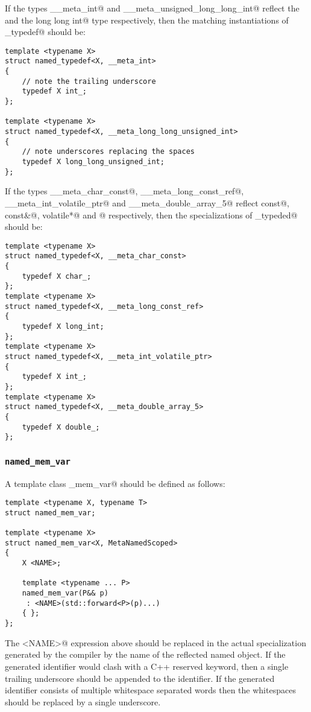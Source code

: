 If the types \verb@__meta_int@ and \verb@__meta_unsigned_long_long_int@ reflect the \verb@int@ and
the \verb@unsigned long long int@ type
respectively, then the matching instantiations of \verb@named_typedef@ should be:

\begin{verbatim}
template <typename X>
struct named_typedef<X, __meta_int>
{
	// note the trailing underscore
	typedef X int_;
};

template <typename X>
struct named_typedef<X, __meta_long_long_unsigned_int>
{
	// note underscores replacing the spaces
	typedef X long_long_unsigned_int;
};
\end{verbatim}

If the types \verb@__meta_char_const@, \verb@__meta_long_const_ref@, \verb@__meta_int_volatile_ptr@ and \verb@__meta_double_array_5@
reflect \verb@char const@, \verb@long const&@, \verb@int volatile*@ and \verb@double[5]@ respectively,
then the specializations of \verb@named_typeded@ should be:

\begin{verbatim}
template <typename X>
struct named_typedef<X, __meta_char_const>
{
	typedef X char_;
};
template <typename X>
struct named_typedef<X, __meta_long_const_ref>
{
	typedef X long_int;
};
template <typename X>
struct named_typedef<X, __meta_int_volatile_ptr>
{
	typedef X int_;
};
template <typename X>
struct named_typedef<X, __meta_double_array_5>
{
	typedef X double_;
};
\end{verbatim}

\subsubsection{\texttt{named\_mem\_var}}

A template class \verb@named_mem_var@ should be defined as follows:

\begin{verbatim}
template <typename X, typename T>
struct named_mem_var;

template <typename X>
struct named_mem_var<X, MetaNamedScoped>
{
	X <NAME>;

	template <typename ... P>
	named_mem_var(P&& p)
	 : <NAME>(std::forward<P>(p)...)
	{ };
};
\end{verbatim}

The \verb@<NAME>@ expression above should be replaced in the actual specialization generated by the compiler
by the name of the reflected named object. If the generated identifier would clash with a C++
reserved keyword, then a single trailing underscore should be appended to the identifier.
If the generated identifier consists of multiple whitespace separated words then the whitespaces
should be replaced by a single underscore.

